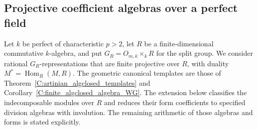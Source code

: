 \subsection{Projective coefficient algebras over a perfect field}
\label{C:artinian-perfect-subsection}

Let $k$ be perfect of characteristic $p>2$, let $R$ be a
finite-dimensional commutative $k$-algebra, and put
$G_R=O_{m,k}\times_kR$ for the split group. We consider rational
$G_R$-representations that are finite projective over $R$,
with duality $M^*=\operatorname{Hom}_R(M,R)$.
The geometric canonical templates are those of
Theorem~\ref{C:artinian_algclosed_templates} and
Corollary~\ref{C:finite_algclosed_algebra_WG}.
The extension below classifies the indecomposable modules over $R$
and reduces their form coefficients to specified division algebras
with involution. The remaining arithmetic of those algebras and
forms is stated explicitly.

